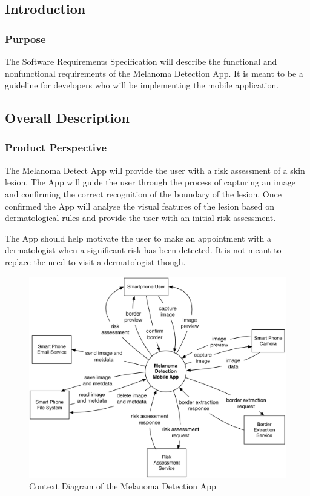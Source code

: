     \subsection{Introduction}

        \subsubsection{Purpose}

            The Software Requirements Specification will describe the functional and nonfunctional requirements of the Melanoma Detection App. It is meant to be a guideline for developers who will be implementing the mobile application.

    \subsection{Overall Description}

        \subsubsection{Product Perspective}

            The Melanoma Detect App will provide the user with a risk assessment of a skin lesion. The App will guide the user through the process of capturing an image and confirming the correct recognition of the boundary of the lesion. Once confirmed the App will analyse the visual features of the lesion based on dermatological rules and provide the user with an initial risk assessment.

    The App should help motivate the user to make an appointment with a dermatologist when a significant risk has been detected. It is not meant to replace the need to visit a dermatologist though.


            \begin{figure}[H]
                \centering
                \includegraphics[width=\textwidth]{assets/requirements/ContextDiagram.pdf}
                \caption{Context Diagram of the Melanoma Detection App}
                \label{fig:partial_feature_tree}
            \end{figure}


